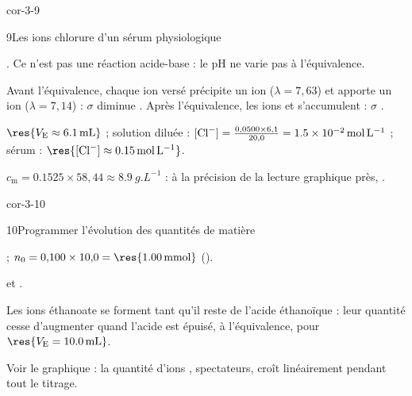 \begin{blocLivre}{cor-3-9}
\begin{corrige}{9}{Les ions chlorure d'un sérum physiologique}
\begin{questions}
\item {}. Ce n'est pas une réaction acide-base : le pH ne varie pas à l'équivalence.
\item Avant l'équivalence, chaque ion  versé précipite un ion  ($\lambda=7{,}63$) et apporte un ion
 ($\lambda=7{,}14$) : $\sigma$ diminue . Après l'équivalence, les ions 
et  s'accumulent : $\sigma$ .
\item $\res{V_\mathrm{E}\approx\qty{6,1}{mL}}$ ; solution diluée : $[\ce{Cl-}]=\frac{0{,}0500\times6{,}1}{20{,}0}=\qty{1,5e-2}{mol.L^{-1}}$ ;
sérum : $\res{[\ce{Cl-}]\approx\qty{0,15}{mol.L^{-1}}}$.
\item $c_\mathrm{m}=\num{0.1525}\times58{,}44\approx\qty{8,9}{g.L^{-1}}$ : à la précision de la lecture graphique près,
.
\end{questions}
\end{corrige}
\end{blocLivre}
\begin{blocLivre}{cor-3-10}
\begin{corrige}{10}{Programmer l'évolution des quantités de matière}
\begin{questions}
\item {} ; $n_0=0{,}100\times10{,}0=\res{\qty{1,00}{mmol}}$ ().
\item {} et .
\item Les ions éthanoate se forment tant qu'il reste de l'acide éthanoïque : leur quantité cesse d'augmenter quand
l'acide est épuisé, à l'équivalence, pour $\res{V_\mathrm{E}=\qty{10,0}{mL}}$.
\item Voir le graphique : la quantité d'ions , spectateurs, croît linéairement pendant tout le titrage.
\end{questions}
\end{corrige}
\end{blocLivre}
